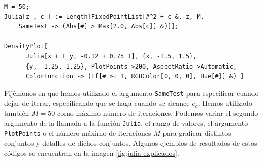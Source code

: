 \begin{verbatim}
M = 50;
Julia[z_, c_] := Length[FixedPointList[#^2 + c &, z, M, 
    SameTest -> (Abs[#] > Max[2.0, Abs[c]] &)]];
    
DensityPlot[
      Julia[x + I y, -0.12 + 0.75 I], {x, -1.5, 1.5}, 
      {y, -1.25, 1.25}, PlotPoints->200, AspectRatio->Automatic, 
      ColorFunction -> (If[# >= 1, RGBColor[0, 0, 0], Hue[#]] &) ]
\end{verbatim}

Fijémonos en que hemos utilizado el argumento \verb|SameTest| para especificar cuando dejar de iterar, especificando que se haga cuando se alcance $e_c$. Hemos utilizado también $M=50$ como máximo número de iteraciones. Podemos variar el segundo argumento de la llamada a la función \verb|Julia|, el rango de valores, el argumento \verb|PlotPoints| o el número máximo de iteraciones $M$ para graficar distintos conjuntos y detalles de dichos conjuntos. Algunos ejemplos de resultados de estos códigos se encuentran en la imagen \ref{fig:julia-explicados}.

